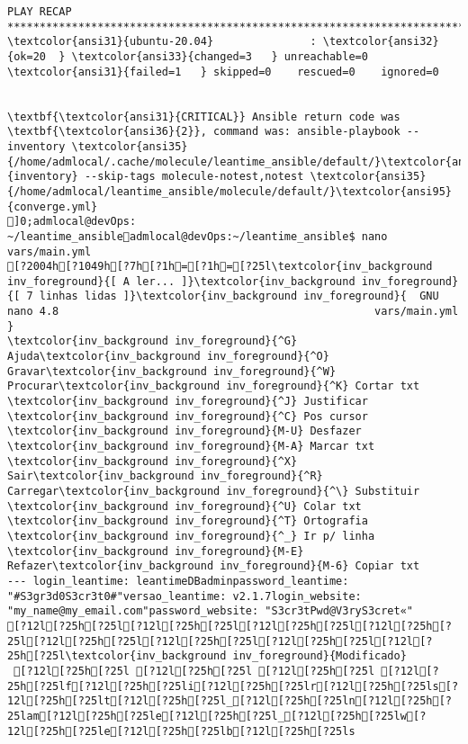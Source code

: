 \documentclass{scrartcl}
\begin{document}
\begin{Verbatim}
PLAY RECAP *******************************************************************************************************************************
\textcolor{ansi31}{ubuntu-20.04}               : \textcolor{ansi32}{ok=20  } \textcolor{ansi33}{changed=3   } unreachable=0    \textcolor{ansi31}{failed=1   } skipped=0    rescued=0    ignored=0


\textbf{\textcolor{ansi31}{CRITICAL}} Ansible return code was \textbf{\textcolor{ansi36}{2}}, command was: ansible-playbook --inventory \textcolor{ansi35}{/home/admlocal/.cache/molecule/leantime_ansible/default/}\textcolor{ansi95}{inventory} --skip-tags molecule-notest,notest \textcolor{ansi35}{/home/admlocal/leantime_ansible/molecule/default/}\textcolor{ansi95}{converge.yml}
]0;admlocal@devOps: ~/leantime_ansibleadmlocal@devOps:~/leantime_ansible$ nano vars/main.yml 
[?2004h[?1049h[?7h[?1h=[?1h=[?25l\textcolor{inv_background inv_foreground}{[ A ler... ]}\textcolor{inv_background inv_foreground}{[ 7 linhas lidas ]}\textcolor{inv_background inv_foreground}{  GNU nano 4.8                                                 vars/main.yml                                                              }
\textcolor{inv_background inv_foreground}{^G} Ajuda\textcolor{inv_background inv_foreground}{^O} Gravar\textcolor{inv_background inv_foreground}{^W} Procurar\textcolor{inv_background inv_foreground}{^K} Cortar txt    \textcolor{inv_background inv_foreground}{^J} Justificar    \textcolor{inv_background inv_foreground}{^C} Pos cursor    \textcolor{inv_background inv_foreground}{M-U} Desfazer     \textcolor{inv_background inv_foreground}{M-A} Marcar txt
\textcolor{inv_background inv_foreground}{^X} Sair\textcolor{inv_background inv_foreground}{^R} Carregar\textcolor{inv_background inv_foreground}{^\} Substituir    \textcolor{inv_background inv_foreground}{^U} Colar txt     \textcolor{inv_background inv_foreground}{^T} Ortografia    \textcolor{inv_background inv_foreground}{^_} Ir p/ linha   \textcolor{inv_background inv_foreground}{M-E} Refazer\textcolor{inv_background inv_foreground}{M-6} Copiar txt
--- login_leantime: leantimeDBadminpassword_leantime: "#S3gr3d0S3cr3t0#"versao_leantime: v2.1.7login_website: "my_name@my_email.com"password_website: "S3cr3tPwd@V3ryS3cret«"
[?12l[?25h[?25l[?12l[?25h[?25l[?12l[?25h[?25l[?12l[?25h[?25l[?12l[?25h[?25l[?12l[?25h[?25l[?12l[?25h[?25l[?12l[?25h[?25l\textcolor{inv_background inv_foreground}{Modificado}
 [?12l[?25h[?25l [?12l[?25h[?25l [?12l[?25h[?25l [?12l[?25h[?25lf[?12l[?25h[?25li[?12l[?25h[?25lr[?12l[?25h[?25ls[?12l[?25h[?25lt[?12l[?25h[?25l_[?12l[?25h[?25ln[?12l[?25h[?25lam[?12l[?25h[?25le[?12l[?25h[?25l_[?12l[?25h[?25lw[?12l[?25h[?25le[?12l[?25h[?25lb[?12l[?25h[?25ls

\end{Verbatim}
\end{document}
